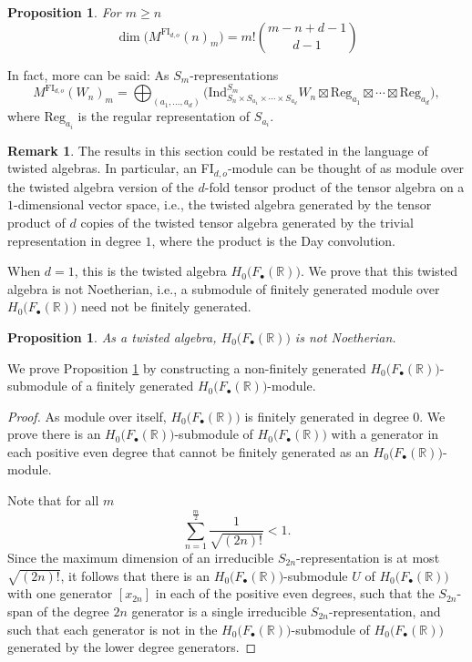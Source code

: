 \documentclass[pagebackref,colorlinks,citecolor=blue,linkcolor=blue,urlcolor=blue,filecolor=blue]{article}
\newtheorem{prop}[thm]{Proposition}
\theoremstyle{definition}\newtheorem{definition}[thm]{Definition}
\theoremstyle{definition}
\newtheorem{remark}[thm]{Remark}
\newcommand{\R}{\ensuremath{\mathbb{R}}}
\begin{document}
\begin{prop}\label{size of a free FIOk}
For $m\ge n$
\[
\dim\big(M^{\text{FI}_{d,o}}(n)_{m}\big)=m!\binom{m-n+d-1}{d-1}
\]
\end{prop}

In fact, more can be said: As $S_{m}$-representations
\[
M^{\text{FI}_{d,o}}(W_{n})_{m}=\bigoplus_{(a_{1}, \dots, a_{d})}\big(\text{Ind}^{S_{m}}_{S_{n}\times S_{a_{1}}\times\cdots\times S_{a_{d}}}W_{n}\boxtimes \text{Reg}_{a_{1}}\boxtimes\cdots\boxtimes \text{Reg}_{a_{d}}\big),
\]
where $\text{Reg}_{a_{i}}$ is the regular representation of $S_{a_{i}}$.


\begin{remark}
The results in this section could be restated in the language of twisted algebras.
In particular, an FI$_{d,o}$-module can be thought of as module over the twisted algebra version of the $d$-fold tensor product of the tensor algebra on a $1$-dimensional vector space, i.e., the twisted algebra generated by the tensor product of $d$ copies of the twisted tensor algebra generated by the trivial representation in degree $1$, where the product is the Day convolution.

When $d=1$, this is the twisted algebra $H_{0}\big(F_{\bullet}(\R)\big)$.
We prove that this twisted algebra is not Noetherian, i.e., a submodule of finitely generated module over $H_{0}\big(F_{\bullet}(\R)\big)$ need not be finitely generated.

\begin{prop}\label{not Noetherian}
As a twisted algebra, $H_{0}\big(F_{\bullet}(\R)\big)$ is not Noetherian.
\end{prop}

We prove Proposition \ref{not Noetherian} by constructing a non-finitely generated $H_{0}\big(F_{\bullet}(\R)\big)$-submodule of a finitely generated $H_{0}\big(F_{\bullet}(\R)\big)$-module.

\begin{proof}
As module over itself, $H_{0}\big(F_{\bullet}(\R)\big)$ is finitely generated in degree $0$.
We prove there is an $H_{0}\big(F_{\bullet}(\R)\big)$-submodule of $H_{0}\big(F_{\bullet}(\R)\big)$ with a generator in each positive even degree that cannot be finitely generated as an $H_{0}\big(F_{\bullet}(\R)\big)$-module.
 
Note that for all $m$
\[
\sum_{n=1}^{\frac{m}{2}}\frac{1}{\sqrt{(2n)!}}<1.
\]
Since the maximum dimension of an irreducible $S_{2n}$-representation is at most $\sqrt{(2n)!}$, it follows that there is an $H_{0}\big(F_{\bullet}(\R)\big)$-submodule $U$ of $H_{0}\big(F_{\bullet}(\R)\big)$ with one generator $[x_{2n}]$ in each of the positive even degrees, such that the $S_{2n}$-span of the degree $2n$ generator is a single irreducible $S_{2n}$-representation, and such that each generator is not in the $H_{0}\big(F_{\bullet}(\R)\big)$-submodule of $H_{0}\big(F_{\bullet}(\R)\big)$ generated by the lower degree generators.


\end{proof}
\end{remark}
\end{document}
